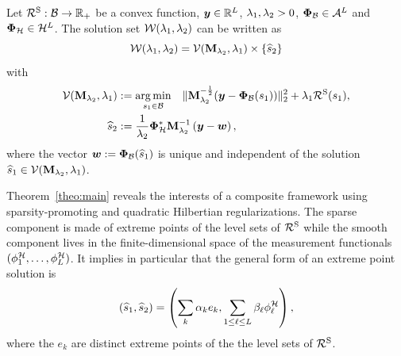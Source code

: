 \documentclass[12pt]{article}
\begin{document}
    \begin{theorem} \label{theo:main}
        Let $\mathcal{R}^\mathrm{S}: \mathcal{B} \to \mathbb{R}_+$ be a convex function,  $\bm{y}\in \mathbb{R}^L$, $\lambda_1, \lambda_{2} > 0$, $\bm{\Phi}_\mathcal{B} \in \mathcal{A}^L$ and $\bm{\Phi}_\mathcal{H} \in \mathcal{H}^L$.
        The solution set $\mathcal{W} (\lambda_{1},\lambda_{2})$ can be written as
        \begin{equation}
            \label{eq:decoupling}
            \mathcal{W} (\lambda_{1},\lambda_{2}) = \mathcal{V}(\mathbf{M}_{\lambda_{2}},\lambda_{1}) \times \{\widehat{s}_2\}
        \end{equation}
        with
        \begin{align}
            \mathcal{V}(\mathbf{M}_{\lambda_{2}},\lambda_{1}) &:= \underset{ s_1 \in \mathcal{B}}{\arg\min} \quad \|\mathbf{M}_{\lambda_{2}}^{-\frac{1}{2}} ( \bm{y} - \bm{\Phi}_\mathcal{B}(s_1)  ) \|_2^2  + \lambda_{1} \mathcal{R}^\mathrm{S}(s_1), \label{eq:banachpart} \\
            \widehat{s}_2 &:=  \frac{1}{\lambda_{2}}\bm{\Phi}_\mathcal{H}^* \mathbf{M}_{\lambda_{2}}^{-1} \left(\bm{y} - \bm{w}\right), \label{eq:hilbertpart}
        \end{align}
        where the vector $\bm{w} := \bm{\Phi}_\mathcal{B} ( \widehat{s}_1)$ is unique and independent of the solution $\widehat{s}_1 \in \mathcal{V}(\mathbf{M}_{\lambda_{2}},\lambda_{1})$. 
    \end{theorem}

    Theorem~\ref{theo:main} reveals the interests of a composite framework using sparsity-promoting and quadratic Hilbertian regularizations. The sparse component is made of extreme points of the level sets of $\mathcal{R}^\mathrm{S}$ while the smooth component lives in the finite-dimensional space of the measurement functionals $(\phi^\mathcal{H}_1, \ldots, \phi^\mathcal{H}_L)$. It implies in particular that the general form of an extreme point solution is 
    \begin{equation*}
        \left(\widehat{s}_1, \widehat{s}_2 \right) = \left(\sum_{k} \alpha_k e_k, \sum_{1 \leq \ell \leq L} \beta_\ell \phi^\mathcal{H}_{\ell}\right),
    \end{equation*}
    where the $e_k$ are distinct extreme points of the the level sets of $\mathcal{R}^\mathrm{S}$. 
\end{document}
